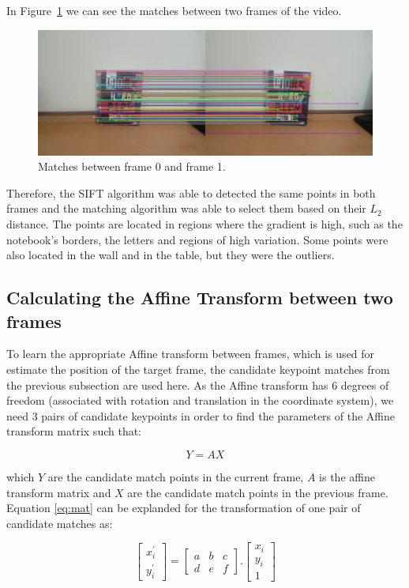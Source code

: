 \documentclass[]{IEEEtran}
\begin{document}
In Figure~\ref{fig:matches_1} we can see the matches between two frames of the video.

\begin{figure}[H]
     \centering
     \includegraphics[width=0.9\hsize]{img/matches_1.jpg}
      \caption{Matches between frame 0 and frame 1.}
     \label{fig:matches_1}
\end{figure}

Therefore, the SIFT algorithm was able to detected the same points in both frames and the matching algorithm was able to select them based on their $L_2$ distance. The points are located in regions where the gradient is high, such as the notebook's borders, the letters and regions of high variation. Some points were also located in the wall and in the table, but they were the outliers.


\subsection{Calculating the Affine Transform between two frames}

To learn the appropriate Affine transform between frames, which is used for estimate the position of the target frame, the candidate keypoint matches from the previous subsection are used here. As the Affine transform has 6 degrees of freedom (associated with rotation and translation in the coordinate system), we need 3 pairs of candidate keypoints in order to find the parameters of the Affine transform matrix such that:

\begin{equation}
    Y = AX
    \label{eq:mat}
\end{equation}

which $Y$ are the candidate match points in the current frame, $A$ is the affine transform matrix and $X$ are the candidate match points in the previous frame. 
Equation \ref{eq:mat} can be explanded for the transformation of one pair of candidate matches as:

\begin{equation}
\begin{bmatrix}
  x_{i}^{'} \\ y_{i}^{'}
\end{bmatrix}  =
\begin{bmatrix}
  a & b & c \\ d & e & f
\end{bmatrix}.
\begin{bmatrix}
  x_{i} \\ y_{i} \\ 1
\end{bmatrix}  
\end{equation}
\end{document}
